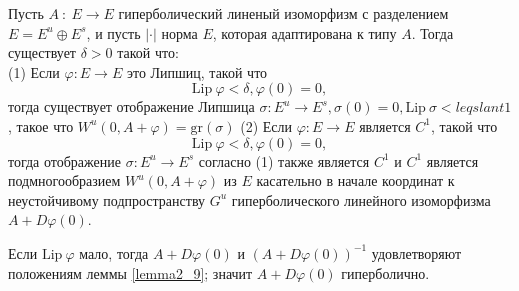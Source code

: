 \begin{lemma}
\label{lemma2_17}
Пусть $A \ : \ E \rightarrow E$ гиперболический линеный изоморфизм с разделением $E = E^u \oplus E^s$, и пусть $|\cdot|$ норма $E$, которая адаптирована к типу $A$. Тогда существует $\delta > 0$ такой что: \\
(1) Если $\varphi : E \rightarrow E$ это Липшиц, такой что 
$$
\mathrm{Lip} \ \varphi < \delta, \varphi(0) = 0,
$$
тогда существует отображение Липшица $\sigma: E^u \rightarrow E^s, \sigma(0)=0, \mathrm{Lip} \ \sigma <leqslant 1$, такое что $W^u(0,A + \varphi) = \mathrm{gr}(\sigma)$ 
(2) Если $\varphi : E \rightarrow E$ является $C^1$, такой что 
$$
\mathrm{Lip} \ \varphi < \delta, \varphi(0) = 0,
$$
тогда отображение $\sigma : E^u \rightarrow E^s$ согласно (1) также является $C^1$ и $C^1$ является подмногообразием $W^u(0, A + \varphi)$ из $E$ касательно в начале координат к неустойчивому подпространству $G^u$ гиперболического линейного изоморфизма $A + D\varphi(0)$.
\end{lemma}

\begin{remark}
Если $\mathrm{Lip} \ \varphi$ мало, тогда $A+D\varphi(0)$ и $(A+D\varphi(0))^{-1}$ удовлетворяют положениям леммы \ref{lemma2_9}; значит $A+D\varphi(0)$ гиперболично.
\end{remark}


